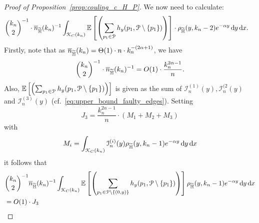 \begin{proof}[Proof of Proposition~\ref{prop:couling_c_H_P}]
We now need to calculate:
\begin{align*}
&{k_n\choose 2}^{-1}\cdot \overline{n}_{\widetilde{\mathbb{H}}}(k_n)^{-1} \int_{{\mathcal K}_{C}(k_n)} \mathbb{E}\left[\left( \sum_{p_1 \in {\mathcal P}} h_y (p_1, {\mathcal P} \setminus \{ p_1 \})\right)\right] \cdot 
 \rho_{\widetilde{\mathbb{H}}}(y,k_n-2) e^{-\alpha y} \operatorname{\mathrm{d}\hspace{-2pt}} y \operatorname{\mathrm{d}\hspace{-2pt}} x.
\end{align*}
Firstly, note that as $\overline{n}_{\widetilde{\mathbb{H}}}(k_n) = \Theta (1) \cdot n \cdot k_n^{-(2\alpha +1)}$, we have 
$$ {k_n\choose 2}^{-1}\cdot \overline{n}_{\widetilde{\mathbb{H}}}(k_n)^{-1} = O(1) \cdot \frac{k_n^{2\alpha-1}}{n}.$$
Also, $\mathbb{E}\left[\left( \sum_{p_1 \in {\mathcal P}} h_y (p_1, {\mathcal P} \setminus \{ p_1 \})\right)\right]$ is given 
as the sum of $\mathcal{I}_n^{(1)}(y), \mathcal{I}_n^{(2}(y)$ and $\mathcal{I}_n^{(3)}(y)$ (cf.~\eqref{eq:upper_bound_faulty_edges}). Setting 
\[
	J_3 = \frac{k_n^{2\alpha-1}}{n}\cdot  \left(M_1+ M_2 + M_3 \right)
\]
with
\[
	M_i = \int_{{\mathcal K}_{C}(k_n)} \mathcal{I}_n^{(i)}(y) \rho_{\widetilde{\mathbb{H}}}(y,k_n-1) e^{-\alpha y} \operatorname{\mathrm{d}\hspace{-2pt}} y \operatorname{\mathrm{d}\hspace{-2pt}} x
\]
it follows that 
\begin{align*}
&{k_n\choose 2}^{-1} \overline{n}_{\widetilde{\mathbb{H}}}(k_n)^{-1} \int_{{\mathcal K}_{C}(k_n)} \mathbb{E}\left[\left( \sum_{p_1 \in {\mathcal P} \setminus \{(0,y)\}} h_y (p_1, {\mathcal P} \setminus \{ p_1 \})\right)\right] \rho_{\widetilde{\mathbb{H}}}(y,k_n-1) e^{-\alpha y} \operatorname{\mathrm{d}\hspace{-2pt}} y \operatorname{\mathrm{d}\hspace{-2pt}} x \\
&= O(1) \cdot J_3
\end{align*}


\end{proof}
